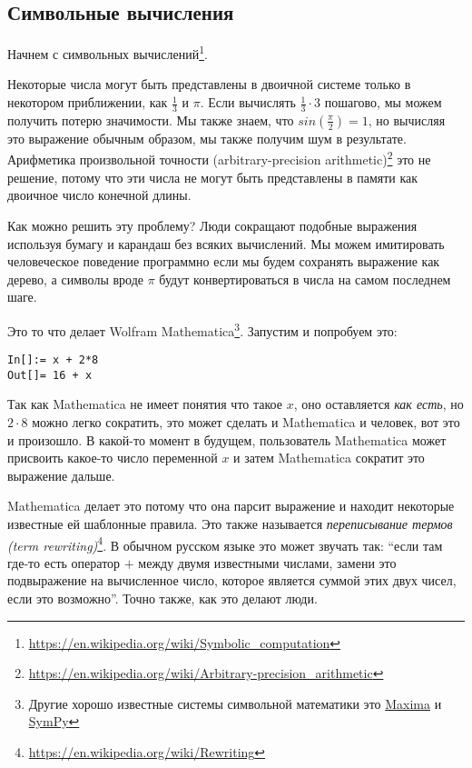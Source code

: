\subsection{Символьные вычисления}

Начнем с символьных вычислений\footnote{\url{https://en.wikipedia.org/wiki/Symbolic_computation}}.

Некоторые числа могут быть представлены в двоичной системе только в некотором приближении, как $\frac{1}{3}$ и $\pi$.
Если вычислять $\frac{1}{3} \cdot 3$ пошагово, мы можем получить потерю значимости.
Мы также знаем, что $sin(\frac{\pi}{2}) = 1$, но вычисляя это выражение обычным образом, мы также получим шум в результате.
Арифметика произвольной точности (arbitrary-precision arithmetic)\footnote{\url{https://en.wikipedia.org/wiki/Arbitrary-precision_arithmetic}} это не решение, потому что эти числа не могут быть представлены в памяти 
как двоичное число конечной длины.

Как можно решить эту проблему?
Люди сокращают подобные выражения используя бумагу и карандаш без всяких вычислений.
Мы можем имитировать человеческое поведение программно если мы будем сохранять выражение как дерево,
а символы вроде $\pi$ будут конвертироваться в числа на самом последнем шаге.

Это то что делает Wolfram Mathematica\footnote{Другие хорошо известные системы символьной математики это 
\href{https://en.wikipedia.org/wiki/Maxima_\%28software\%29}{Maxima} и 
\href{https://en.wikipedia.org/wiki/SymPy}{SymPy}}.
Запустим и попробуем это:

\begin{lstlisting}
In[]:= x + 2*8
Out[]= 16 + x
\end{lstlisting}

Так как Mathematica не имеет понятия что такое $x$, оно оставляется \textit{как есть}, но $2 \cdot 8$ можно легко
сократить, это может сделать и Mathematica и человек, вот это и произошло.
В какой-то момент в будущем, пользователь Mathematica может присвоить какое-то число переменной
$x$ и затем Mathematica сократит это выражение дальше.

Mathematica делает это потому что она парсит выражение и находит некоторые известные ей шаблонные правила.
Это также называется \textit{переписывание термов (term rewriting)}\footnote{\url{https://en.wikipedia.org/wiki/Rewriting}}.
В обычном русском языке это может звучать так:
``если там где-то есть оператор $+$ между двумя известными числами,
замени это подвыражение на вычисленное число, которое является
суммой этих двух чисел, если это возможно''.
Точно также, как это делают люди.

